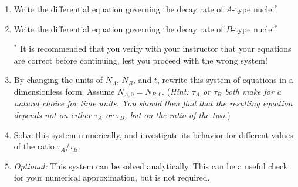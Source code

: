\documentclass{article}
\begin{document}
\begin{enumerate}
	\begin{enumerate}
		\item Write the differential equation governing the decay rate of $A$-type nuclei$^*$
		\item Write the differential equation governing the decay rate of $B$-type nuclei$^*$
		
		{\footnotesize $^*$ It is recommended that you verify with your instructor that your equations are correct before continuing, lest you proceed with the wrong system!}
		\item By changing the units of $N_A$, $N_B$, and $t$, rewrite this system of equations in a dimensionless form. Assume $N_{A,0}=N_{B,0}$. (\textit{Hint: $\tau_A$ or $\tau_B$ both make for a natural choice for time units. You should then find that the resulting equation depends not on either $\tau_A$ or $\tau_B$, but on the ratio of the two.})
		\item Solve this system numerically, and investigate its behavior for different values of the ratio $\tau_A/\tau_B$.
		\item \textit{Optional:} This system can be solved analytically. This can be a useful check for your numerical approximation, but is not required.
	\end{enumerate}
\end{enumerate}
\end{document}
